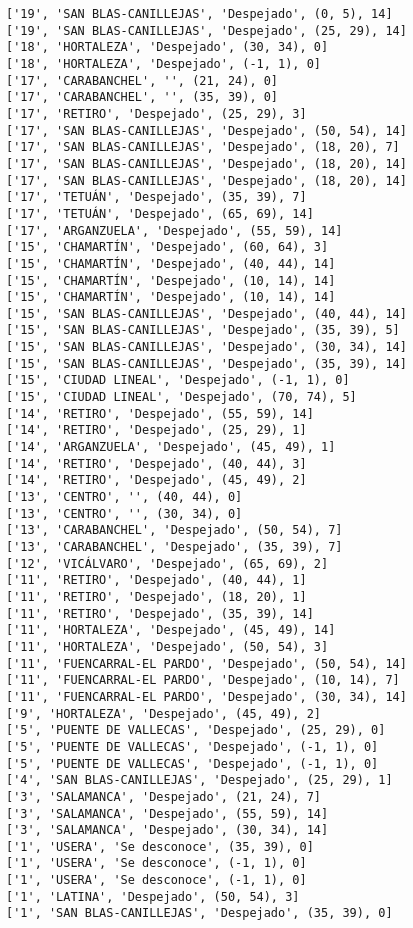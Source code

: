 \documentclass[11pt]{article}
\begin{document}
\begin{Verbatim}[commandchars=\\\{\}]
['19', 'SAN BLAS-CANILLEJAS', 'Despejado', (0, 5), 14]
['19', 'SAN BLAS-CANILLEJAS', 'Despejado', (25, 29), 14]
['18', 'HORTALEZA', 'Despejado', (30, 34), 0]
['18', 'HORTALEZA', 'Despejado', (-1, 1), 0]
['17', 'CARABANCHEL', '', (21, 24), 0]
['17', 'CARABANCHEL', '', (35, 39), 0]
['17', 'RETIRO', 'Despejado', (25, 29), 3]
['17', 'SAN BLAS-CANILLEJAS', 'Despejado', (50, 54), 14]
['17', 'SAN BLAS-CANILLEJAS', 'Despejado', (18, 20), 7]
['17', 'SAN BLAS-CANILLEJAS', 'Despejado', (18, 20), 14]
['17', 'SAN BLAS-CANILLEJAS', 'Despejado', (18, 20), 14]
['17', 'TETUÁN', 'Despejado', (35, 39), 7]
['17', 'TETUÁN', 'Despejado', (65, 69), 14]
['17', 'ARGANZUELA', 'Despejado', (55, 59), 14]
['15', 'CHAMARTÍN', 'Despejado', (60, 64), 3]
['15', 'CHAMARTÍN', 'Despejado', (40, 44), 14]
['15', 'CHAMARTÍN', 'Despejado', (10, 14), 14]
['15', 'CHAMARTÍN', 'Despejado', (10, 14), 14]
['15', 'SAN BLAS-CANILLEJAS', 'Despejado', (40, 44), 14]
['15', 'SAN BLAS-CANILLEJAS', 'Despejado', (35, 39), 5]
['15', 'SAN BLAS-CANILLEJAS', 'Despejado', (30, 34), 14]
['15', 'SAN BLAS-CANILLEJAS', 'Despejado', (35, 39), 14]
['15', 'CIUDAD LINEAL', 'Despejado', (-1, 1), 0]
['15', 'CIUDAD LINEAL', 'Despejado', (70, 74), 5]
['14', 'RETIRO', 'Despejado', (55, 59), 14]
['14', 'RETIRO', 'Despejado', (25, 29), 1]
['14', 'ARGANZUELA', 'Despejado', (45, 49), 1]
['14', 'RETIRO', 'Despejado', (40, 44), 3]
['14', 'RETIRO', 'Despejado', (45, 49), 2]
['13', 'CENTRO', '', (40, 44), 0]
['13', 'CENTRO', '', (30, 34), 0]
['13', 'CARABANCHEL', 'Despejado', (50, 54), 7]
['13', 'CARABANCHEL', 'Despejado', (35, 39), 7]
['12', 'VICÁLVARO', 'Despejado', (65, 69), 2]
['11', 'RETIRO', 'Despejado', (40, 44), 1]
['11', 'RETIRO', 'Despejado', (18, 20), 1]
['11', 'RETIRO', 'Despejado', (35, 39), 14]
['11', 'HORTALEZA', 'Despejado', (45, 49), 14]
['11', 'HORTALEZA', 'Despejado', (50, 54), 3]
['11', 'FUENCARRAL-EL PARDO', 'Despejado', (50, 54), 14]
['11', 'FUENCARRAL-EL PARDO', 'Despejado', (10, 14), 7]
['11', 'FUENCARRAL-EL PARDO', 'Despejado', (30, 34), 14]
['9', 'HORTALEZA', 'Despejado', (45, 49), 2]
['5', 'PUENTE DE VALLECAS', 'Despejado', (25, 29), 0]
['5', 'PUENTE DE VALLECAS', 'Despejado', (-1, 1), 0]
['5', 'PUENTE DE VALLECAS', 'Despejado', (-1, 1), 0]
['4', 'SAN BLAS-CANILLEJAS', 'Despejado', (25, 29), 1]
['3', 'SALAMANCA', 'Despejado', (21, 24), 7]
['3', 'SALAMANCA', 'Despejado', (55, 59), 14]
['3', 'SALAMANCA', 'Despejado', (30, 34), 14]
['1', 'USERA', 'Se desconoce', (35, 39), 0]
['1', 'USERA', 'Se desconoce', (-1, 1), 0]
['1', 'USERA', 'Se desconoce', (-1, 1), 0]
['1', 'LATINA', 'Despejado', (50, 54), 3]
['1', 'SAN BLAS-CANILLEJAS', 'Despejado', (35, 39), 0]

\end{Verbatim}
\end{document}
